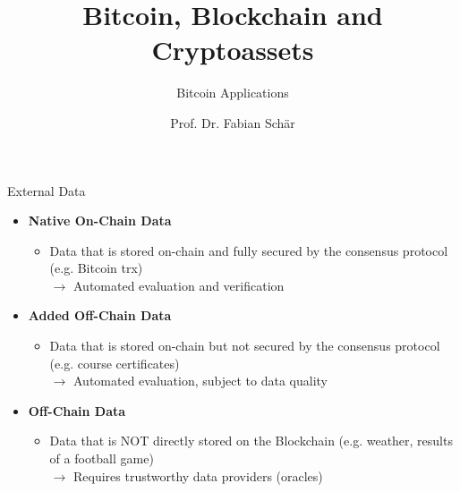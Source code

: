 \documentclass[handout]{beamer}
\title{Bitcoin, Blockchain and Cryptoassets}
\subtitle{Bitcoin Applications}
\author{Prof. Dr. Fabian Schär}
\institute{University of Basel}
\begin{document}
\thispagestyle{empty}
\begin{frame}[noframenumbering]
	\titlepage
\end{frame}


\begin{frame}{External Data}	
	\begin{itemize}
		\item<1 ->\textbf{Native On-Chain Data}
		\begin{itemize}
			\item<1 ->Data that is stored on-chain and fully secured by the consensus protocol (e.g. Bitcoin trx)\\
			\vspace{0.25em}$\rightarrow$ Automated evaluation and verification
		\end{itemize}
		\vspace{1em}
		\item<2 ->\textbf{Added Off-Chain Data}
		\begin{itemize}
			\item<2 -> Data that is stored on-chain but not secured by the consensus protocol (e.g. course certificates)\\
			\vspace{0.25em}$\rightarrow$ Automated evaluation, subject to data quality
		\end{itemize}
		\vspace{1em}
		\item<3 -> \textbf{Off-Chain Data}
		\begin{itemize}
			\item<3 -> Data that is NOT directly stored on the Blockchain (e.g. weather, results of a football game)\\
			\vspace{0.25em}$\rightarrow$ Requires trustworthy data providers (oracles)
		\end{itemize}
	\end{itemize}
\end{frame}

\end{document}
